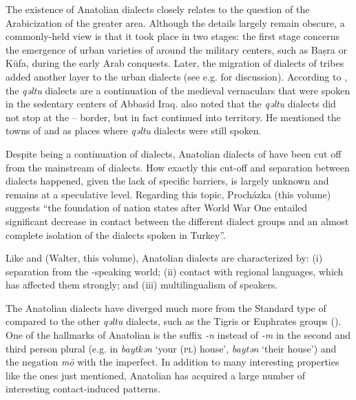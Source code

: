 \documentclass[output=paper]{langsci/langscibook}
\begin{document}
The existence of Anatolian dialects closely relates to the question of the Arabicization of the greater  area. Although the details largely remain obscure, a commonly-held view is that it took place in two stages: the first stage concerns the emergence of urban varieties of  around the military centers, such as Ba\d{s}ra or K\={u}fa, during the early Arab conquests. Later, the migration of  dialects of tribes added another layer to the urban dialects (see e.g. \citealt{Blanc1964,Versteegh1997,Jastrow2006} for discussion). According to \cite{Blanc1964}, the \textit{qəltu} dialects are a continuation of the medieval vernaculars that were spoken in the sedentary centers of Abbasid Iraq. \cite{Blanc1964} also noted that the \textit{qəltu} dialects did not stop at the -- border, but in fact continued into  territory. He mentioned the towns of  and  as places where \textit{qəltu} dialects were still spoken.

Despite being a continuation of  dialects, Anatolian dialects of  have been cut off from the mainstream of  dialects. How exactly this cut-off and separation between dialects happened, given the lack of specific barriers, is largely unknown and remains at a speculative level. Regarding this topic, Proch\'{a}zka (this volume) suggests ``the foundation of nation states after World War One entailed significant decrease in contact between the different dialect groups and an almost complete isolation of the  dialects spoken in Turkey''.

Like   and  (Walter, this volume), Anatolian  dialects are characterized by: (i) separation from the -speaking world; (ii) contact with regional languages, which has affected them strongly; and (iii) multilingualism of speakers. %

The Anatolian dialects have diverged much more from the Standard type of  compared to the other \textit{qəltu} dialects, such as the Tigris or Euphrates groups (\citealt{Jastrow2011iraq}). One of the hallmarks of Anatolian  is the suffix \textit{-n} instead of \textit{-m} in the second and third person plural (e.g. in   \textit{baytkən} `your (\textsc{pl}) house', \textit{baytən} `their house') and the {negation} \textit{m\={o}} with the imperfect. In addition to many interesting properties like the ones just mentioned, Anatolian  has acquired a large number of interesting contact-induced patterns.
\end{document}
